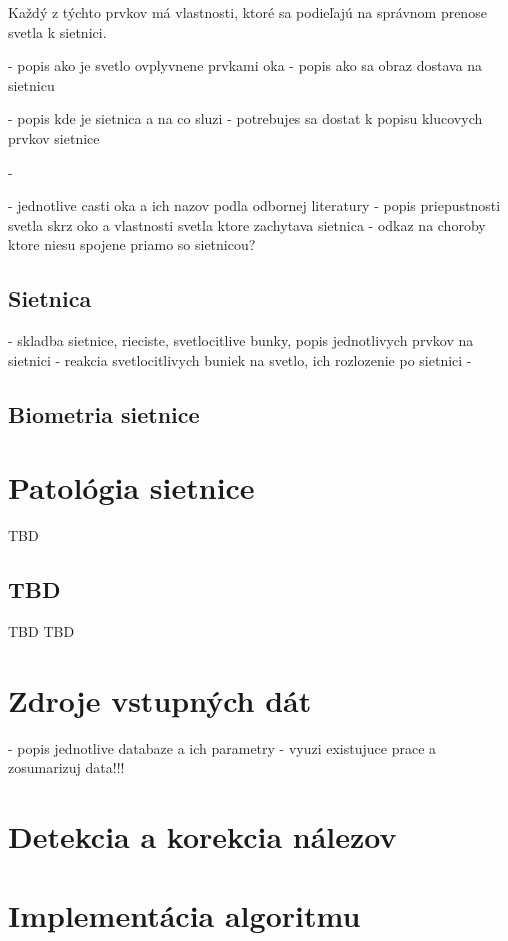 Každý z týchto prvkov má vlastnosti, ktoré sa podieľajú na správnom prenose svetla k sietnici. 


- popis ako je svetlo ovplyvnene prvkami oka
- popis ako sa obraz dostava na sietnicu

- popis kde je sietnica a na co sluzi \cite{vlast_oka}
- potrebujes sa dostat k popisu klucovych prvkov sietnice

- 

- jednotlive casti oka a ich nazov podla odbornej literatury
- popis priepustnosti svetla skrz oko a vlastnosti svetla ktore zachytava sietnica
- odkaz na choroby ktore niesu spojene priamo so sietnicou?

\section{Sietnica}\label{sec:sietnica}
- skladba sietnice, rieciste, svetlocitlive bunky, popis jednotlivych prvkov na sietnici
- reakcia svetlocitlivych buniek na svetlo, ich rozlozenie po sietnici
- 

\section{Biometria sietnice}\label{sec:bioret}

\chapter{Patológia sietnice}\label{ch:kap2}
TBD\cite{prim}
\section{TBD}
TBD\cite{sec}
TBD\cite{bio}

\chapter{Zdroje vstupných dát}\label{ch:kap3}
- popis jednotlive databaze a ich parametry - vyuzi existujuce prace a zosumarizuj data!!!

\chapter{Detekcia a korekcia nálezov}\label{ch:kap4}

\chapter{Implementácia algoritmu}

